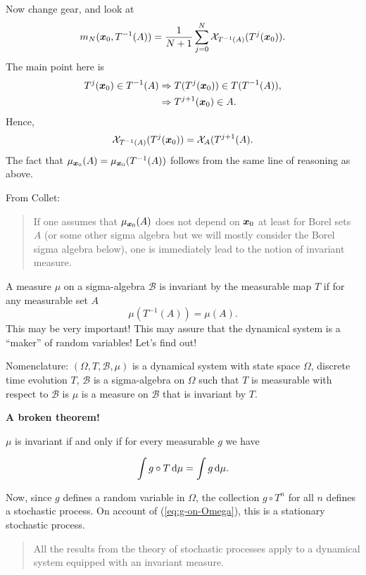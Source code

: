 \documentclass[12pt]{article}
\begin{document}
Now change gear, and look at
\[
m_N(\boldsymbol{x}_0,T^{-1}(A)) = \frac{1}{N+1}\sum_{j=0}^N \mathord{\mathcal{X}}_{T^{-1}(A)}(T^j(\boldsymbol{x}_0)).
\]
The main point here is
\begin{align*}
T^j(\boldsymbol{x}_0) \in T^{-1}(A) &\Rightarrow T(T^j(\boldsymbol{x}_0)) \in T(T^{-1}(A)),\\
                             &\Rightarrow T^{j+1}(\boldsymbol{x}_0) \in A.
\end{align*}
Hence,
\[
\mathord{\mathcal{X}}_{T^{-1}(A)}(T^j(\boldsymbol{x}_0)) = \mathord{\mathcal{X}}_A(T^{j+1}(A).
\]
The fact that $\mu_{\boldsymbol{x}_0}(A) = \mu_{\boldsymbol{x}_0}(T^{-1}(A))$ follows from the same line of reasoning as above.

From Collet:
\begin{quote}
If one assumes that $\mu_{\boldsymbol{x}_0}(A)$ does not depend on $\boldsymbol{x}_0$ at least for Borel sets
$A$ (or some other sigma algebra but we will mostly consider the Borel sigma
algebra below), one is immediately lead to the notion of invariant measure.
\end{quote}

A measure $\mu$ on a sigma-algebra $\mathcal{B}$ is invariant by the measurable map $T$ if for any measurable set $A$ 
\begin{equation}
\mu\left(T^{-1}(A)\right) = \mu(A).
\end{equation}
This may be very important!  This may assure that the dynamical system is a ``maker'' of random variables!  Let's find out!

Nomenclature: $(\Omega, T, \mathcal{B}, \mu)$ is a dynamical system with state
space $\Omega$, discrete time evolution $T$, $\mathcal{B}$ is a sigma-algebra on
$\Omega$ such that $T$ is measurable with respect to $\mathcal{B}$ is $\mu$ is a
measure on $\mathcal{B}$ that is invariant by $T$.

\textbf{A broken theorem!}

$\mu$ is invariant if and only if for every measurable $g$ we have 

\begin{equation}
\int g \circ T \,\mathrm{d}{\mu} = \int g \,\mathrm{d}{\mu}.\label{eq:g-on-Omega}
\end{equation}

Now, since $g$ defines a random variable in $\Omega$, the collection $g\circ
T^n$ for all $n$ defines a stochastic process. On account of
(\ref{eq:g-on-Omega}), this is a stationary stochastic process.

\begin{quote}
All the results from the theory of stochastic processes apply to a dynamical
system equipped with an invariant measure.
\end{quote}
\end{document}
